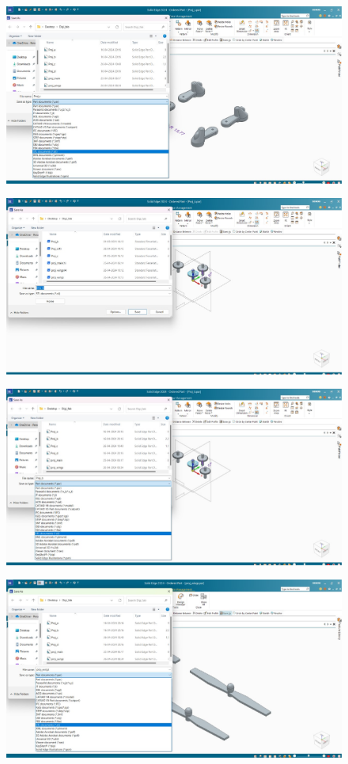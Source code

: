 \documentclass{article}
\begin{document}
\begin{figure}[H]
\centering
\includegraphics[scale = 0.3 ]{./figs/8.jpeg}
\end{figure}
\begin{figure}[H]
\centering
\includegraphics[scale = 0.3 ]{./figs/9.jpeg}
\end{figure}
\begin{figure}[H]
\centering
\includegraphics[scale = 0.3 ]{./figs/10.jpeg}
\end{figure}
\begin{figure}[H]
\centering
\includegraphics[scale = 0.3 ]{./figs/11.jpeg}
\end{figure}
\end{document}
